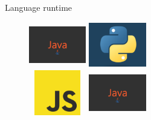 \documentclass[9pt]{beamer}
\begin{document}
\begin{frame}{Language runtime}
  \begin{figure}
    \centering
    \includegraphics[width=2.5cm,height=2cm]{img/javalogo.jpg}
    \includegraphics[width=2.5cm,height=2cm]{img/pylogo1.png}\\
    \includegraphics[width=2.5cm,height=2cm]{img/jslogo.png}
    \includegraphics[width=2.5cm,height=2cm]{img/javalogo.jpg}
  \end{figure}
  \centering
\end{frame}

\end{document}
